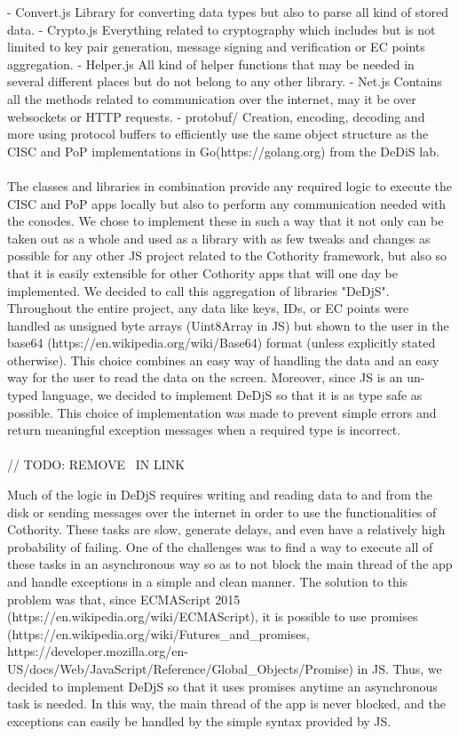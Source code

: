 - Convert.js
  Library for converting data types but also to parse all kind of stored data.
- Crypto.js
  Everything related to cryptography which includes but is not limited to key pair generation, message signing and verification or EC points aggregation.
- Helper.js
  All kind of helper functions that may be needed in several different places but do not belong to any other library.
- Net.js
  Contains all the methods related to communication over the internet, may it be over websockets or HTTP requests.
- protobuf/
  Creation, encoding, decoding and more using protocol buffers to efficiently use the same object structure as the CISC and PoP implementations in Go(https://golang.org) from the DeDiS lab.

\paragraph{}
The classes and libraries in combination provide any required logic to execute the CISC and PoP apps locally but also to perform any communication needed with the conodes. We chose to implement these in such a way that it not only can be taken out as a whole and used as a library with as few tweaks and changes as possible for any other JS project related to the Cothority framework, but also so that it is easily extensible for other Cothority apps that will one day be implemented. We decided to call this aggregation of libraries "DeDjS".
Throughout the entire project, any data like keys, IDs, or EC points were handled as unsigned byte arrays (Uint8Array in JS) but shown to the user in the base64 (https://en.wikipedia.org/wiki/Base64) format (unless explicitly stated otherwise). This choice combines an easy way of handling the data and an easy way for the user to read the data on the screen. Moreover, since JS is an un-typed language, we decided to implement DeDjS so that it is as type safe as possible. This choice of implementation was made to prevent simple errors and return meaningful exception messages when a required type is incorrect.

\paragraph{}

// TODO: REMOVE \ IN LINK

Much of the logic in DeDjS requires writing and reading data to and from the disk or sending messages over the internet in order to use the functionalities of Cothority. These tasks are slow, generate delays, and even have a relatively high probability of failing. One of the challenges was to find a way to execute all of these tasks in an asynchronous way so as to not block the main thread of the app and handle exceptions in a simple and clean manner. The solution to this problem was that, since ECMAScript 2015 (https://en.wikipedia.org/wiki/ECMAScript), it is possible to use promises (https://en.wikipedia.org/wiki/Futures\_and\_promises, https://developer.mozilla.org/en-US/docs/Web/JavaScript/Reference/Global\_Objects/Promise) in JS. Thus, we decided to implement DeDjS so that it uses promises anytime an asynchronous task is needed. In this way, the main thread of the app is never blocked, and the exceptions can easily be handled by the simple syntax provided by JS.
